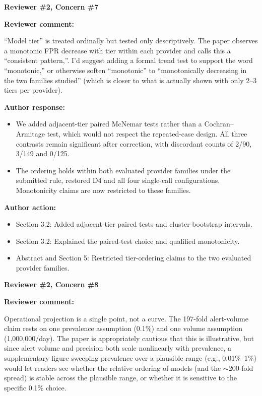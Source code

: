 \documentclass[11pt]{article}
\newcommand{\rvcomment}[1]{{\color{ReviewerGreen}#1}}
\newcommand{\concern}[1]{\textbf{\color{ReviewerGreen}#1}}
\begin{document}
\vspace{12pt}
\concern{Reviewer \#2, Concern \#7}

\concern{Reviewer comment:}

\rvcomment{``Model tier'' is treated ordinally but tested only descriptively. The paper observes a monotonic FPR decrease with tier within each provider and calls this a ``consistent pattern,''. I'd suggest adding a formal trend test to support the word ``monotonic,'' or otherwise soften ``monotonic'' to ``monotonically decreasing in the two families studied'' (which is closer to what is actually shown with only 2--3 tiers per provider).}

\textbf{Author response:}

\begin{itemize}

\item We added adjacent-tier paired McNemar tests rather than a Cochran--Armitage test, which would not respect the repeated-case design. All three contrasts remain significant after correction, with discordant counts of 2/90, 3/149 and 0/125.

\item The ordering holds within both evaluated provider families under the submitted rule, restored D4 and all four single-call configurations. Monotonicity claims are now restricted to these families.

\end{itemize}

\textbf{Author action:}

\begin{itemize}

\item Section 3.2: Added adjacent-tier paired tests and cluster-bootstrap intervals.

\item Section 3.2: Explained the paired-test choice and qualified monotonicity.

\item Abstract and Section 5: Restricted tier-ordering claims to the two evaluated provider families.

\end{itemize}

\vspace{12pt}
\concern{Reviewer \#2, Concern \#8}

\concern{Reviewer comment:}

\rvcomment{Operational projection is a single point, not a curve. The 197-fold alert-volume claim rests on one prevalence assumption (0.1\%) and one volume assumption (1,000,000/day). The paper is appropriately cautious that this is illustrative, but since alert volume and precision both scale nonlinearly with prevalence, a supplementary figure sweeping prevalence over a plausible range (e.g., 0.01\%--1\%) would let readers see whether the relative ordering of models (and the $\sim$200-fold spread) is stable across the plausible range, or whether it is sensitive to the specific 0.1\% choice.}
\end{document}
